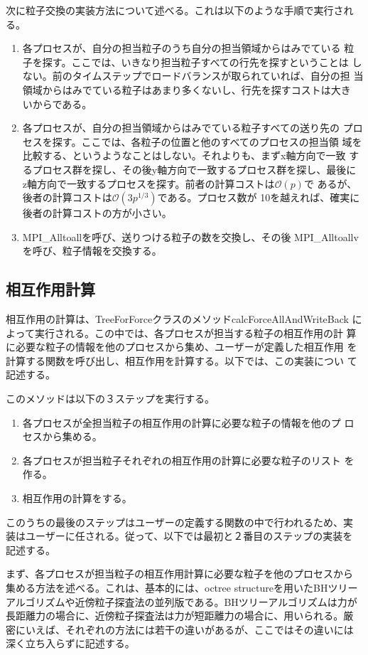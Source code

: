 \documentclass[12pt,a4paper]{jarticle}
\begin{document}
次に粒子交換の実装方法について述べる。これは以下のような手順で実行され
る。
\begin{enumerate}
\item 各プロセスが、自分の担当粒子のうち自分の担当領域からはみでている
  粒子を探す。ここでは、いきなり担当粒子すべての行先を探すということは
  しない。前のタイムステップでロードバランスが取られていれば、自分の担
  当領域からはみでている粒子はあまり多くないし、行先を探すコストは大き
  いからである。
\item 各プロセスが、自分の担当領域からはみでている粒子すべての送り先の
  プロセスを探す。ここでは、各粒子の位置と他のすべてのプロセスの担当領
  域を比較する、というようなことはしない。それよりも、まずx軸方向で一致
  するプロセス群を探し、その後y軸方向で一致するプロセス群を探し、最後に
  z軸方向で一致するプロセスを探す。前者の計算コストは$\mathcal{O}(p)$で
  あるが、後者の計算コストは$\mathcal{O}(3p^{1/3})$である。プロセス数が
  10を越えれば、確実に後者の計算コストの方が小さい。
\item MPI\_Alltoallを呼び、送りつける粒子の数を交換し、その後
  MPI\_Alltoallvを呼び、粒子情報を交換する。
\end{enumerate}

\subsection{相互作用計算}

相互作用の計算は、TreeForForceクラスのメソッドcalcForceAllAndWriteBack
によって実行される。この中では、各プロセスが担当する粒子の相互作用の計
算に必要な粒子の情報を他のプロセスから集め、ユーザーが定義した相互作用
を計算する関数を呼び出し、相互作用を計算する。以下では、この実装につい
て記述する。

このメソッドは以下の３ステップを実行する。
\begin{enumerate}
\item 各プロセスが全担当粒子の相互作用の計算に必要な粒子の情報を他のプ
  ロセスから集める。
\item 各プロセスが担当粒子それぞれの相互作用の計算に必要な粒子のリスト
  を作る。
\item 相互作用の計算をする。
\end{enumerate}
このうちの最後のステップはユーザーの定義する関数の中で行われるため、実
装はユーザーに任される。従って、以下では最初と２番目のステップの実装を
記述する。

まず、各プロセスが担当粒子の相互作用計算に必要な粒子を他のプロセスから
集める方法を述べる。これは、基本的には、octree structureを用いたBHツリー
アルゴリズムや近傍粒子探査法の並列版である。BHツリーアルゴリズムは力が
長距離力の場合に、近傍粒子探査法は力が短距離力の場合に、用いられる。厳
密にいえば、それぞれの方法には若干の違いがあるが、ここではその違いには
深く立ち入らずに記述する。
\end{document}
